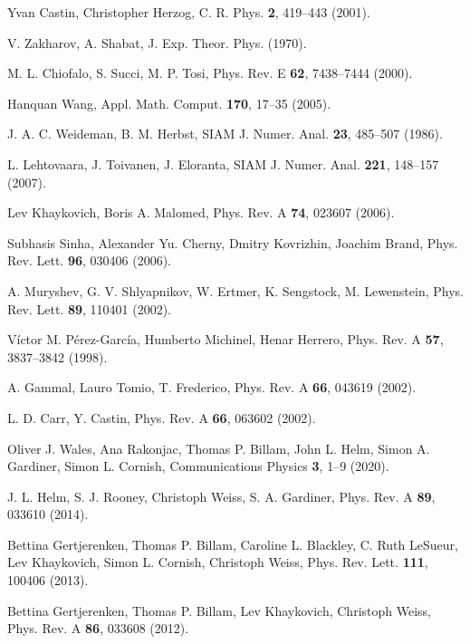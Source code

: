\begin{thebibliography}{99}
Yvan Castin, Christopher Herzog,  C. R. Phys. \textbf{2}, 419--443  (2001).

V. Zakharov, A. Shabat,  J. Exp. Theor. Phys.  (1970).

M. L. Chiofalo, S. Succi, M. P. Tosi,  Phys. Rev. E \textbf{62}, 7438--7444  (2000).

Hanquan Wang,  Appl. Math. Comput. \textbf{170}, 17--35  (2005).

J. A. C. Weideman, B. M. Herbst,  SIAM J. Numer. Anal. \textbf{23}, 485--507  (1986).

L. Lehtovaara, J. Toivanen, J. Eloranta,  SIAM J. Numer. Anal. \textbf{221}, 148--157  (2007).

Lev Khaykovich, Boris A. Malomed,  Phys. Rev. A \textbf{74}, 023607  (2006).

Subhasis Sinha, Alexander Yu. Cherny, Dmitry Kovrizhin, Joachim Brand,  Phys. Rev. Lett. \textbf{96}, 030406  (2006).

A. Muryshev, G. V. Shlyapnikov, W. Ertmer, K. Sengstock, M. Lewenstein,  Phys. Rev. Lett. \textbf{89}, 110401  (2002).

Víctor M. Pérez-García, Humberto Michinel, Henar Herrero,  Phys. Rev. A \textbf{57}, 3837--3842  (1998).

A. Gammal, Lauro Tomio, T. Frederico,  Phys. Rev. A \textbf{66}, 043619  (2002).

L. D. Carr, Y. Castin,  Phys. Rev. A \textbf{66}, 063602  (2002).

Oliver J. Wales, Ana Rakonjac, Thomas P. Billam, John L. Helm, Simon A. Gardiner, Simon L. Cornish,  Communications Physics \textbf{3}, 1--9  (2020).

J. L. Helm, S. J. Rooney, Christoph Weiss, S. A. Gardiner,  Phys. Rev. A \textbf{89}, 033610  (2014).

Bettina Gertjerenken, Thomas P. Billam, Caroline L. Blackley, C. Ruth LeSueur, Lev Khaykovich, Simon L. Cornish, Christoph Weiss,  Phys. Rev. Lett. \textbf{111}, 100406  (2013).

Bettina Gertjerenken, Thomas P. Billam, Lev Khaykovich, Christoph Weiss,  Phys. Rev. A \textbf{86}, 033608  (2012).


\end{thebibliography}
